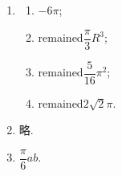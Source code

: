 \begin{enumerate}
\begin{proof}
        \end{proof}
    \item %
        \begin{multicols}{2}
            \begin{enumerate}[(1)]
                \item %
                    $-6\pi$;
                \item %
                    {\color{red}remained}$\dfrac{\pi}{3}R^3$;
                \item %
                    {\color{red}remained}$\dfrac{5}{16}\pi^2$;
                \item %
                    {\color{red}remained}$2\sqrt{2}\pi$.
            \end{enumerate}
        \end{multicols}
    \item %
        略.
    \item %
        $\dfrac{\pi}{6}ab$.
\end{enumerate}
% 

